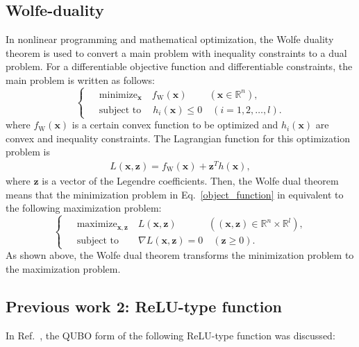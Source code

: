 \documentclass[fp,twocolumn]{jpsj3}
\begin{document}
\subsection{Wolfe-duality} \label{sec:wolfe}
In nonlinear programming and mathematical optimization, the Wolfe duality theorem\cite{wolfe} is used to convert a main problem with inequality constraints to a dual problem.
For a differentiable objective function and differentiable constraints, 
the main problem is written as follows:
\begin{equation}
  \left\{ \,\,
  \begin{aligned}
    & \text{minimize}_{\bm{x}}  \quad  f_{\mathrm{W}}(\bm{x}) \quad \quad \ (\bm{x} \in \mathbb{R}^{n}),\\
    & \text{subject to}  \ \quad h_{i}(\bm{x})\leq 0 \quad (i=1,2,\dots,l). \label{object_function}
  \end{aligned}
  \right.
\end{equation}
where $f_{\mathrm{W}}(\bm{x})$ is a certain convex function to be optimized and $h_{i}(\bm{x})$ are convex and inequality constraints. The Lagrangian function for this optimization problem is
\begin{eqnarray}
  L(\bm{x},\bm{z})=f_{\mathrm{W}}(\bm{x})+\bm{z}^{T}h(\bm{x}),
\end{eqnarray}
where $\bm{z}$ is a vector of the Legendre coefficients. 
Then, the Wolfe dual theorem means that the minimization problem in Eq.~\eqref{object_function} in equivalent to the following maximization problem:
\begin{equation}
  \left\{\,\,
  \begin{aligned}
    & \text{maximize}_{\bm{x},\bm{z}}  \quad L(\bm{x},\bm{z}) \quad \quad \quad \ ((\bm{x},\bm{z})\in \mathbb{R}^{n}\times\mathbb{R}^{l}),\\
    & \text{subject to}  \qquad \nabla L(\bm{x},\bm{z})=0 \quad (\bm{z} \geq 0).
  \end{aligned}
  \right.
\end{equation}
As shown above, the Wolfe dual theorem transforms the minimization problem to the maximization problem.


\subsection{Previous work 2: ReLU-type function}
\label{sec:ReLU}

In Ref.~, the QUBO form of the following ReLU-type function was discussed:
\end{document}
